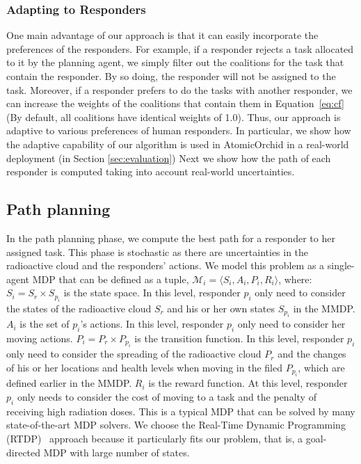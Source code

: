\subsubsection{Adapting to Responders}
One main advantage of our approach is that it can easily
incorporate the preferences of the responders. For example, if a
responder rejects  a task allocated to it by the planning agent, we
simply filter out the coalitions for the task that contain the
responder. By so doing, the responder will not be assigned to the
task. Moreover, if a responder prefers to do the tasks with another
responder, we can increase the weights of the coalitions that
contain them in Equation~\ref{eq:cf} (By default, all coalitions
have identical weights of 1.0). Thus, our approach is adaptive to
various preferences of human responders. In particular, we show how
the adaptive capability of our algorithm is used in AtomicOrchid in
a real-world deployment (in Section \ref{sec:evaluation}) Next we
show how the path of each responder is computed taking into account
real-world uncertainties.

\subsection{Path planning}
\label{sec:pathplanning}

\noindent In the path planning phase, we compute the best path for
a responder to her assigned task. This phase is stochastic as there
are uncertainties in the radioactive cloud and the responders'
actions. We model this problem as a single-agent MDP that can be
defined as a tuple, $\mathcal{M}_i = \langle S_i, A_i, P_i, R_i
\rangle$, where: $S_i = S_r \times S_{p_i}$ is the state space. In
this level, responder $p_i$ only need to consider the states of the
radioactive cloud $S_r$ and his or her own states $S_{p_i}$ in the
MMDP. $A_i$ is the set of $p_i$'s actions. In this level, responder
$p_i$ only need to consider her moving actions. $P_i = P_r \times
P_{p_i}$ is the transition function. In this level, responder $p_i$
only need to consider the spreading of the radioactive cloud $P_r$
and the changes of his or her locations and health levels when
moving in the filed $P_{p_i}$, which are defined earlier in the
MMDP. $R_i$ is the reward function. At this level, responder $p_i$
only needs to consider the cost of moving to a task and the penalty
of receiving high radiation doses. This is a typical MDP that can
be solved by many state-of-the-art MDP solvers. We choose the
Real-Time Dynamic Programming (RTDP)~\cite{barto1995learning}
approach because it particularly fits  our problem, that is, a
goal-directed MDP with large number of states.

